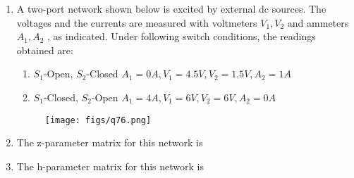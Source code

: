 \documentclass[a4paper, 11pt]{article}
\begin{document}
\begin{enumerate}
    \hfill{}

    \item[] A two-port network shown below is excited by external dc sources. The voltages and the currents are measured with voltmeters $V_1, V_2$ and ammeters $A_1, A_2$ , as indicated. Under following switch conditions, the readings obtained are:
    \begin{enumerate}[label=\roman*.]
        \item $S_1$-Open, $S_2$-Closed $A_1=0A, V_1=4.5V, V_2=1.5V, A_2=1A$
        \item $S_1$-Closed, $S_2$-Open $A_1=4A, V_1=6V, V_2=6V, A_2=0A$
    \end{enumerate}
    
    \begin{figure}[H]
        \centering
        \texttt{[image: figs/q76.png]}
        \caption*{}
        \label{fig:q76}
    \end{figure}
    
    \item The z-parameter matrix for this network is
    \begin{enumerate}
    \end{enumerate}
    
    \hfill{}
    
    \item The h-parameter matrix for this network is
    \begin{enumerate}
    \end{enumerate}
    

\end{enumerate}
\end{document}
